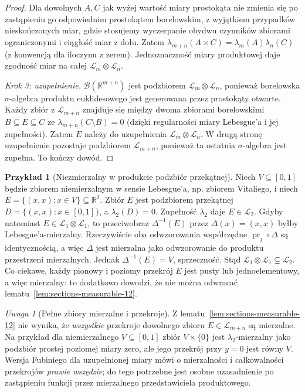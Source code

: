 \documentclass[11pt,a4paper,oneside]{book}
\numberwithin{equation}{chapter}
\theoremstyle{plain}
\theoremstyle{definition}
\newtheorem{przyklad}[twierdzenie]{Przykład}
\theoremstyle{remark}
\newtheorem{uwaga}[twierdzenie]{Uwaga}
\begin{document}
\begin{proof}
Dla dowolnych $A,C$ jak wyżej wartość miary
prostokąta nie zmienia się po zastąpieniu go
odpowiednim prostokątem borelowskim, z wyjątkiem
przypadków nieskończonych miar, gdzie stosujemy
wyczerpanie obydwu czynników zbiorami ograniczonymi
i ciągłość miar z dołu. Zatem
$\lambda_{m+n}(A\times C)=\lambda_m(A)\lambda_n(C)$
(z konwencją dla iloczynu z zerem).
Jednoznaczność miary produktowej daje zgodność
miar na całej $\mathcal L_m\otimes\mathcal L_n$.

\emph{Krok 3: uzupełnienie.}
$\mathcal B(\mathbb R^{m+n})$ jest podzbiorem
$\mathcal L_m\otimes\mathcal L_n$, ponieważ
borelowska $\sigma$-algebra produktu euklidesowego
jest generowana przez prostokąty otwarte.
Każdy zbiór z $\mathcal L_{m+n}$ znajduje się
między dwoma zbiorami borelowskimi $B\subseteq E\subseteq C$
ze $\lambda_{m+n}(C\setminus B)=0$
(dzięki regularności miary Lebesgue'a i jej
zupełności). Zatem $E$ należy do uzupełnienia
$\mathcal L_m\otimes\mathcal L_n$.
W drugą stronę uzupełnienie pozostaje podzbiorem
$\mathcal L_{m+n}$, ponieważ ta ostatnia
$\sigma$-algebra jest zupełna. To kończy dowód.
\end{proof}

\begin{przyklad}[Niezmierzalny w produkcie podzbiór przekątnej]
\label{ex:diagonal-not-product-12}
Niech $V\subseteq[0,1]$ będzie zbiorem niemierzalnym
w sensie Lebesgue'a, np. zbiorem Vitaliego, i niech
$E=\{(x,x):x\in V\}\subseteq\mathbb R^2$.
Zbiór $E$ jest podzbiorem przekątnej
$D=\{(x,x):x\in[0,1]\}$, a $\lambda_2(D)=0$.
Zupełność $\lambda_2$ daje $E\in\mathcal L_2$.
Gdyby natomiast $E\in\mathcal L_1\otimes\mathcal L_1$,
to przeciwobraz $\Delta^{-1}(E)$ przez
$\Delta(x)=(x,x)$ byłby Lebesgue'a-mierzalny.
Rzeczywiście oba odwzorowania współrzędne
$\operatorname{pr}_j\circ\Delta$ są identycznością,
a więc $\Delta$ jest mierzalna jako odwzorowanie
do produktu przestrzeni mierzalnych. Jednak
$\Delta^{-1}(E)=V$, sprzeczność. Stąd
$\mathcal L_1\otimes\mathcal L_1\subsetneq\mathcal L_2$.
Co ciekawe, każdy pionowy i poziomy przekrój $E$
jest pusty lub jednoelementowy, a więc mierzalny:
to dodatkowo dowodzi, że nie można odwracać
lematu~\ref{lem:sections-measurable-12}.
\end{przyklad}

\begin{uwaga}[Pełne zbiory mierzalne i przekroje]
Z lematu~\ref{lem:sections-measurable-12} nie wynika,
że \emph{wszystkie} przekroje dowolnego zbioru
$E\in\mathcal L_{m+n}$ są mierzalne. Na przykład
dla niemierzalnego $V\subseteq[0,1]$ zbiór
$V\times\{0\}$ jest $\lambda_2$-mierzalny jako
podzbiór prostej poziomej miary zero, ale jego
przekrój przy $y=0$ jest równy $V$.
Wersja Fubiniego dla uzupełnionej miary mówi o
mierzalności i całkowalności przekrojów
\emph{prawie wszędzie}; do tego potrzebne jest
osobne uzasadnienie po zastąpieniu funkcji
przez mierzalnego przedstawiciela produktowego.
\end{uwaga}
\end{document}
